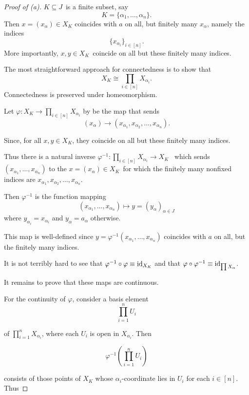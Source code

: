 \begin{proof}[Proof of (a)]
    $K\subseteq J$ is a finite subset, say 
    \[
        K = \{\alpha_1,\ldots,\alpha_n\}. 
    \]
    Then $x = (x_\alpha) \in X_K$ coincides with 
    $a$ on all, but finitely many $x_\alpha$, namely 
    the indices 
    \[
        \{x_{\alpha_i}\}_{i\in[n]}. 
    \]
    More importantly, $x,y \in X_K$ coincide on all 
    but these finitely many indices. 

    The most straightforward approach for 
    connectedness is to show that 
    \[
        X_K \cong \prod_{i\in [n]} X_{\alpha_i}. 
    \]
    Connectedness is preserved under homeomorphism.

    Let $\varphi : X_K \to \prod_{i\in[n]} X_{\alpha_i}$ by 
    be the map that sends 
    \[
        (x_\alpha) \to (x_{\alpha_1}, x_{\alpha_2}, \ldots, 
        x_{\alpha_n}).  
    \]
    
    Since, for all $x,y \in X_K$, they coincide 
    on all but these finitely many indices. 

    Thus there is a 
    natural inverse $\varphi^{-1} : \prod_{i\in[n]} X_{\alpha_i} 
    \to X_K$ 
    which sends $(x_{\alpha_{1}}, \ldots, x_{\alpha_n})$ 
    to the $x = (x_\alpha) \in X_K$ for 
    which the finitely many nonfixed indices are 
    $x_{\alpha_1}, x_{\alpha_2}, \ldots, x_{\alpha_n}$. 


    Then $\varphi^{-1}$ is the function mapping 
    \[
        (x_{\alpha_1}, \ldots, x_{\alpha_n}) 
        \mapsto y = (y_\alpha)_{\alpha \in J} 
    \]
    where $y_{\alpha_i} = x_{\alpha_i}$ and 
    $y_\alpha = a_\alpha$ otherwise. 

    This map is well-defined since 
    $y = \varphi^{-1}(x_{\alpha_1}, \ldots, x_{\alpha_n})$ 
    coincides with $a$ on all, but the finitely 
    many indices. 
    
    It is not terribly hard to see 
    that $\varphi^{-1}\circ \varphi \equiv \operatorname{\operatorname{id}}_{X_K}$ 
    and that $\varphi \circ \varphi^{-1} \equiv \operatorname{\operatorname{id}}_{\prod X_\alpha}$. 
    
    It remains to prove that these maps are continuous.

    For the continuity of $\varphi$, consider a basis element
    \[
        \prod_{i=1}^n U_i
    \]

    of $\prod_{i=1}^n X_{\alpha_i}$, where each
    $U_i$ is open in $X_{\alpha_i}$. Then

    \[
        \varphi^{-1}\left(\prod_{i=1}^n U_i\right)
    \]

    consists of those points of $X_K$ whose
    $\alpha_i$-coordinate lies in $U_i$ for each $i\in[n]$.
    Thus


\end{proof}
